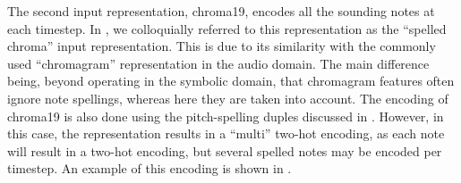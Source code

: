 
The second input representation, \gls{chroma19}, encodes all
the sounding notes at each timestep. In
\textcite{napoleslopez2021augmentednet}, we colloquially
referred to this representation as the ``spelled chroma''
input representation. This is due to its similarity with the
commonly used ``chromagram'' representation in the audio
domain. The main difference being, beyond operating in the
symbolic domain, that chromagram features often ignore note
spellings, whereas here they are taken into account. The
encoding of \gls{chroma19} is also done using the
pitch-spelling duples discussed in
. However, in this
case, the representation results in a ``multi'' two-hot
encoding, as each note will result in a two-hot encoding,
but several spelled notes may be encoded per timestep. An
example of this encoding is shown in
.

